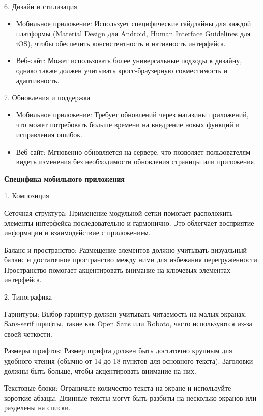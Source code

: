 6. Дизайн и стилизация

\begin{itemize}
    \item Мобильное приложение: Использует специфические гайдлайны для каждой платформы (Material Design для Android, Human Interface Guidelines для iOS), чтобы обеспечить консистентность и нативность интерфейса.
    \item Веб-сайт: Может использовать более универсальные подходы к дизайну, однако также должен учитывать кросс-браузерную совместимость и адаптивность.
\end{itemize}

7. Обновления и поддержка

\begin{itemize}
    \item Мобильное приложение: Требует обновлений через магазины приложений, что может потребовать больше времени на внедрение новых функций и исправления ошибок.
    \item Веб-сайт: Мгновенно обновляется на сервере, что позволяет пользователям видеть изменения без необходимости обновления страницы или приложения.
\end{itemize}

\textbf{Специфика мобильного приложения}
\bigskip

1. Композиция

    Сеточная структура: Применение модульной сетки помогает расположить элементы интерфейса последовательно и гармонично. Это облегчает восприятие информации и взаимодействие с приложением.

    Баланс и пространство: Размещение элементов должно учитывать визуальный баланс и достаточное пространство между ними для избежания перегруженности. Пространство помогает акцентировать внимание на ключевых элементах интерфейса.

2. Типографика

    Гарнитуры: Выбор гарнитур должен учитывать читаемость на малых экранах. Sans-serif шрифты, такие как Open Sans или Roboto, часто используются из-за своей четкости.

    Размеры шрифтов: Размер шрифта должен быть достаточно крупным для удобного чтения (обычно от 14 до 18 пунктов для основного текста). Заголовки должны быть больше, чтобы акцентировать внимание на них.

    Текстовые блоки: Ограничьте количество текста на экране и используйте короткие абзацы. Длинные тексты могут быть разбиты на несколько экранов или разделены на списки.

